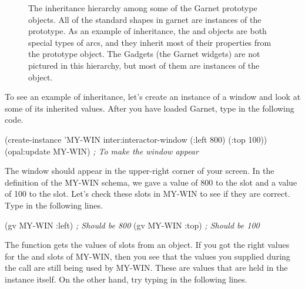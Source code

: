 \begin{figure}
  \begin{center}
  \end{center}
\caption{The inheritance hierarchy among some of the Garnet prototype objects.
All of the standard shapes in garnet are instances of the
 prototype.  As an example of inheritance, the
 and  objects are both special types of arcs, and
they inherit most of their properties from the  prototype
object.  The Gadgets (the Garnet widgets) are not pictured in this
hierarchy, but most of them are instances of the  object.}
\end{figure}

To see an example of inheritance, let's create an instance of a window
and look at some of its inherited values.  After you have loaded Garnet,
type in the following code.

\begin{programexample}
(create-instance 'MY-WIN inter:interactor-window
   (:left 800) (:top 100))
(opal:update MY-WIN)  {\it ; To make the window appear}
\end{programexample}

The window should appear in the upper-right corner of your screen.
In the definition of the MY-WIN schema, we gave a value of 800 to the
 slot and a value of 100 to the  slot.  Let's check
these slots in MY-WIN to see if they are correct.  Type in the
following lines.

\begin{programexample}
(gv MY-WIN :left)    {\it ; Should be 800}
(gv MY-WIN :top)     {\it ; Should be 100}
\end{programexample}

The function  gets the values of slots from an object.
If you got the right values for the  and  slots of
MY-WIN, then you see that the values you supplied during the
 call are still being used by MY-WIN.  These are values
that are held in the instance itself.  On the other hand, try typing
in the following lines.

